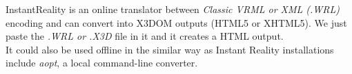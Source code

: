 \documentclass[twoside,12pt,a4paper]{article}
\begin{document}
InstantReality is an online translator between \textit{Classic VRML or XML (.WRL)} encoding and can convert into X3DOM outputs (HTML5 or XHTML5).   We just paste the \textit{.WRL or .X3D} file in it and it creates a HTML output. \\
It could also be used offline in the similar way as Instant Reality installations include \textit{aopt}, a local command-line converter.

\end{document}
